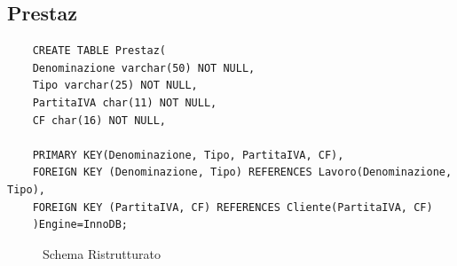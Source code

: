 \documentclass{elegantbook}
\begin{document}
\subsection{Prestaz}
\begin{verbatim}
	CREATE TABLE Prestaz(
	Denominazione varchar(50) NOT NULL,
	Tipo varchar(25) NOT NULL,
	PartitaIVA char(11) NOT NULL,
	CF char(16) NOT NULL,
	
	PRIMARY KEY(Denominazione, Tipo, PartitaIVA, CF),
	FOREIGN KEY (Denominazione, Tipo) REFERENCES Lavoro(Denominazione, Tipo),
	FOREIGN KEY (PartitaIVA, CF) REFERENCES Cliente(PartitaIVA, CF)
	)Engine=InnoDB;
\end{verbatim}
\begin{figure}[H]
	\centering
	\caption{Schema Ristrutturato}
\end{figure}
\end{document}
